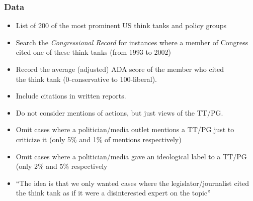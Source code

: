 \documentclass[english]{beamer}
\begin{document}
\begin{frame}

\frametitle{Data}

\begin{itemize}
\setlength{\itemsep}{0.4em}
\item{\small List of 200 of the most prominent US think tanks and policy groups}
\vspace*{3pt}
\item{\small Search the \textit{Congressional Record} for instances where a member of Congress cited one
of these think tanks (from 1993 to 2002)}
\vspace*{3pt}
\item{\small Record the average (adjusted) ADA score of the member who cited \\
the think tank (0-conservative to 100-liberal).}
\pause
\vspace*{3pt}
\item{\small Include citations in written reports.}
\vspace*{3pt}
\item{\small Do not consider mentions of actions, but just views of the TT/PG.}
\vspace*{3pt}
\item{\small Omit cases where a politician/media outlet mentions a TT/PG just to criticize it (only 5\% and 1\% of mentions respectively)}
\vspace*{3pt}
\item{\small Omit cases where a politician/media gave an ideological label to a TT/PG (only 2\% and 5\% respectively}
\vspace*{3pt}
\pause
\item{\small ``The idea is that we only wanted cases where the legislator/journalist cited the think tank as if it were a disinterested expert on the topic''}
\end{itemize}
\end{frame}
\end{document}
